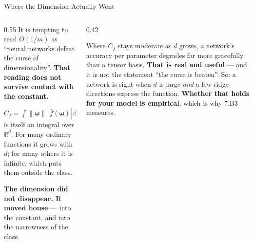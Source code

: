 \begin{frame}{Where the Dimension Actually Went}
\begin{columns}[T]
\begin{column}{0.55\textwidth}
\small
It is tempting to read $O(1/m)$ as ``neural networks defeat the curse of dimensionality''. \textbf{That reading does not survive contact with the constant.}
\medskip

$C_f=\int\lVert\boldsymbol\omega\rVert\,|\hat f(\boldsymbol\omega)|\,\mathrm{d}\boldsymbol\omega$ is itself an integral over $\mathbb{R}^{d}$. For many ordinary functions it grows with $d$; for many others it is infinite, which puts them outside the class.
\medskip

\textbf{The dimension did not disappear. It moved house} --- into the constant, and into the narrowness of the class.
\end{column}
\begin{column}{0.42\textwidth}
\begin{cautionbox}[title=\textbf{What is genuinely true}]\small
Where $C_f$ stays moderate as $d$ grows, a network's accuracy per parameter degrades far more gracefully than a tensor basis. \textbf{That is real and useful} --- and it is not the statement ``the curse is beaten''.
\medskip
So: a network is right when $d$ is large \emph{and} a few ridge directions express the function. \textbf{Whether that holds for your model is empirical}, which is why 7.B3 measures.
\end{cautionbox}
\end{column}
\end{columns}
\vspace{1mm}
\end{frame}

